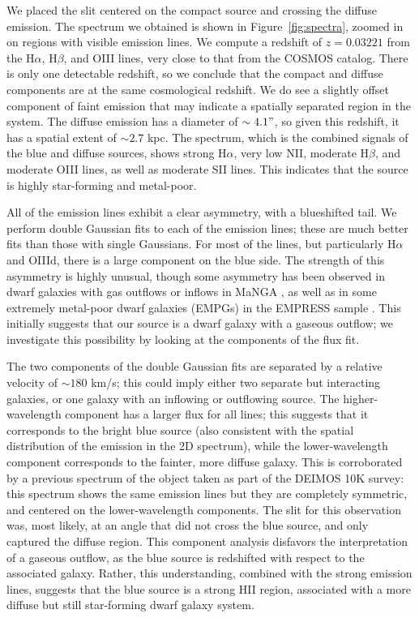 We placed the slit centered on the compact source and crossing the diffuse emission. 
The spectrum we obtained is shown in Figure~\ref{fig:spectra}, zoomed in on regions with visible emission lines.
We compute a redshift of $z=0.03221$ from the H$\alpha$, H$\beta$, and OIII lines, very close to that from the COSMOS catalog.
There is only one detectable redshift, so we conclude that the compact and diffuse components are at the same cosmological redshift.
We do see a slightly offset component of faint emission that may indicate a spatially separated region in the system.
The diffuse emission has a diameter of $\sim4.1"$, so given this redshift, it has a spatial extent of $\sim2.7$ kpc.
The spectrum, which is the combined signals of the blue and diffuse sources, shows strong H$\alpha$, very low NII, moderate H$\beta$, and moderate OIII lines, as well as moderate SII lines. 
This indicates that the source is highly star-forming and metal-poor.

All of the emission lines exhibit a clear asymmetry, with a blueshifted tail.
We perform double Gaussian fits to each of the emission lines; these are much better fits than those with single Gaussians.
For most of the lines, but particularly H$\alpha$ and OIIId, there is a large component on the blue side.
The strength of this asymmetry is highly unusual, though some asymmetry has been observed in dwarf galaxies with gas outflows or inflows in MaNGA \citep{Wylezalek2020, Avery2021}, as well as in some extremely metal-poor dwarf galaxies (EMPGs) in the EMPRESS sample \citep{Kojima2019}.
This initially suggests that our source is a dwarf galaxy with a gaseous outflow; we investigate this possibility by looking at the components of the flux fit.

The two components of the double Gaussian fits are separated by a relative velocity of $\sim180$ km/s; this could imply either two separate but interacting galaxies, or one galaxy with an inflowing or outflowing source.
The higher-wavelength component has a larger flux for all lines; this suggests that it corresponds to the bright blue source (also
consistent with the spatial distribution of
the emission in the 2D spectrum), while the lower-wavelength component corresponds to the fainter, more diffuse galaxy.
This is corroborated by a previous spectrum of the object taken as part of the DEIMOS 10K survey: this spectrum shows the same emission lines but they are completely symmetric, and centered on the lower-wavelength components. 
The slit for this observation was, most likely, at an angle that did not cross the blue source, and only captured the diffuse region.
This component analysis disfavors the interpretation of a gaseous outflow, as the blue source is redshifted with respect to the associated galaxy.
Rather, this understanding, combined with the strong emission lines, suggests that the blue source is a strong HII region, associated with a more diffuse but still star-forming dwarf galaxy system.

